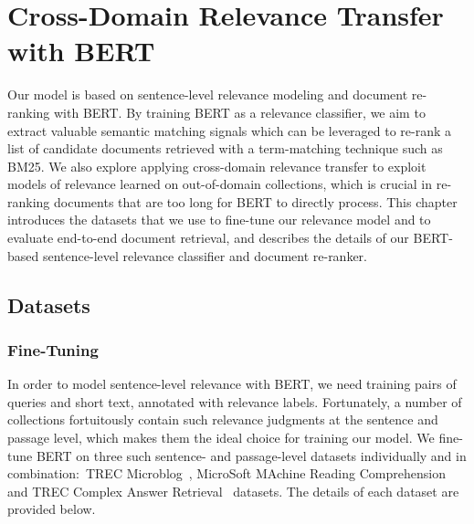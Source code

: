 \chapter{Cross-Domain Relevance Transfer with BERT}
\label{ch:model}


Our model is based on sentence-level relevance modeling and document re-ranking with BERT.
By training BERT as a relevance classifier, we aim to extract valuable semantic matching signals which can be leveraged to re-rank a list of candidate documents retrieved with a term-matching technique such as BM25.
We also explore applying cross-domain relevance transfer to exploit models of relevance learned on out-of-domain collections, which is crucial in re-ranking documents that are too long for BERT to directly process.
This chapter introduces the datasets that we use to fine-tune our relevance model and to evaluate end-to-end document retrieval, and describes the details of our BERT-based sentence-level relevance classifier and document re-ranker.

\section{Datasets}

\subsection{Fine-Tuning}

In order to model sentence-level relevance with BERT, we need training pairs of queries and short text, annotated with relevance labels.
Fortunately, a number of collections fortuitously contain such relevance judgments at the sentence and passage level, which makes them the ideal choice for training our model.
We fine-tune BERT on three such sentence- and passage-level datasets individually and in combination:\ TREC Microblog~\cite{ounisoverview}, MicroSoft MAchine Reading Comprehension~\cite{nguyen2016msmarco} and TREC Complex Answer Retrieval~\cite{dietz2017trec} datasets.
The details of each dataset are provided below.

